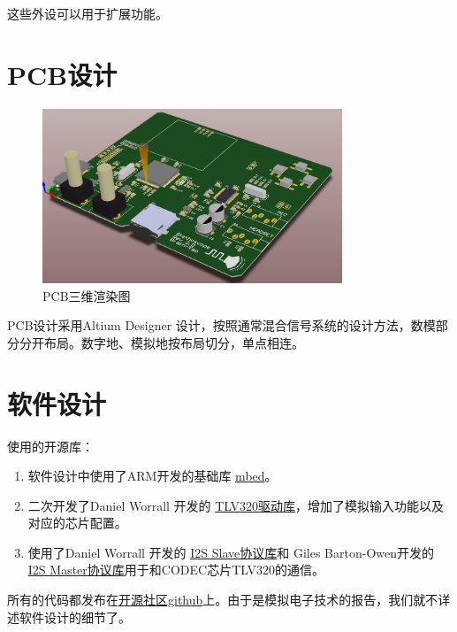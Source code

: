 \documentclass[16pt,a4paper]{article}
\begin{document}
这些外设可以用于扩展功能。

\section{PCB设计}
\begin{figure}[H]
\centering
\includegraphics[width=0.8\textwidth]{pcb3D.png}
\caption{PCB三维渲染图} 
\end{figure}
PCB设计采用Altium Designer 设计，按照通常混合信号系统的设计方法，数模部分分开布局。数字地、模拟地按布局切分，单点相连。


\section{软件设计}
使用的开源库：
\begin{enumerate}
\item 软件设计中使用了ARM开发的基础库 \href{https://developer.mbed.org/users/mbed_official/code/mbed/}{mbed}。
\item 二次开发了Daniel Worrall 开发的 \href{https://developer.mbed.org/cookbook/TLV320AIC23B}{TLV320驱动库}，增加了模拟输入功能以及对应的芯片配置。
\item 使用了Daniel Worrall 开发的 \href{https://developer.mbed.org/users/d_worrall/code/I2SSlave/}{I2S Slave协议库}和 Giles Barton-Owen开发的 \href{https://developer.mbed.org/users/p07gbar/code/I2S/}{I2S Master协议库}用于和CODEC芯片TLV320的通信。
\end{enumerate}


所有的代码都发布在\href{https://github.com/gjc13/Stethoscope}{开源社区github}上。由于是模拟电子技术的报告，我们就不详述软件设计的细节了。
\end{document}
